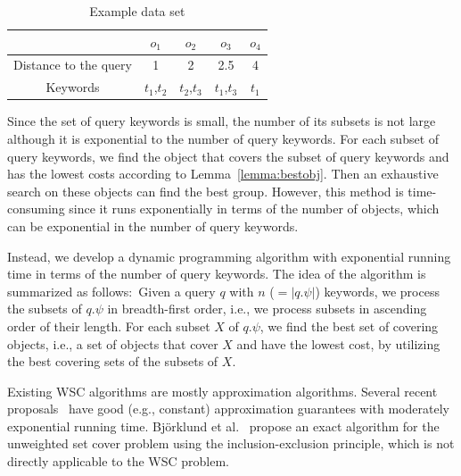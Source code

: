 \documentclass{sig-alternate}
\newcounter{example}[section]
\begin{document}
\begin{table}[h]\vspace{-2ex}
  \centering \small
  \begin{tabular}{|c|c|c|c|c|}
    \hline
    &   $o_1$ & $o_2$ & $o_3$ & $o_4$ \\
    \hline
    Distance to the query & 1 & 2 & 2.5 & 4\\
    \hline
    Keywords & $t_1$,$t_2$ & $t_2$,$t_3$ & $t_1$,$t_3$ & $t_1$\\
    \hline
  \end{tabular}\vspace{-1ex}\caption{Example data set}\label{tbl:example}\vspace{-2ex}
\end{table}

Since the set of query keywords is small, the number of its subsets
is not large although it is exponential to the number of query
keywords. For each subset of query keywords, we  find the object
that covers the subset of query keywords and has the lowest costs
according to Lemma~\ref{lemma:bestobj}. Then an exhaustive search on
these objects can find the best group. However, this method is
time-consuming since it runs exponentially in terms of the number of
objects, which can be exponential in the number of query keywords.



Instead, we develop a dynamic programming algorithm with
exponential running time in terms of the number of query keywords.
The idea of the algorithm is summarized as follows:~Given a query $q$
with $n$ ($= |q.\psi|$) keywords, we process the subsets of $q.\psi$
in breadth-first order, i.e., we process subsets in ascending order
of their length. For each subset $X$ of $q.\psi$, we find the best
set of covering objects, i.e., a set of objects that cover
$X$ and have the lowest cost, by utilizing the best
covering sets of the subsets of $X$.

Existing WSC algorithms are mostly approximation algorithms. Several
recent proposals~\cite{exp1,exp2} have good (e.g., constant)
approximation guarantees with moderately exponential running time.
%
Bj\"{o}rklund et al.~\cite{exp3} propose an exact algorithm for the
unweighted set cover problem using the inclusion-exclusion principle,
which is not directly applicable to the WSC problem.
\end{document}
